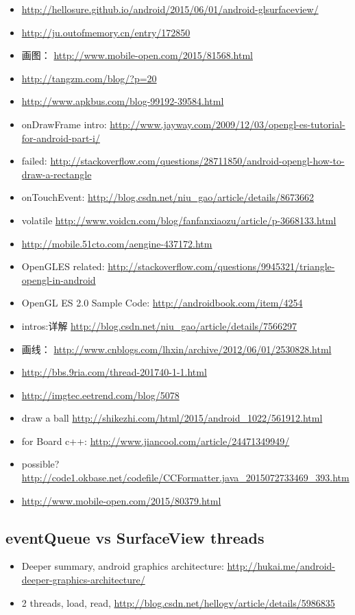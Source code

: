 \documentclass[9pt,b5paper]{article}
\begin{document}
\begin{itemize}
\item \url{http://hellosure.github.io/android/2015/06/01/android-glsurfaceview/}
\item \url{http://ju.outofmemory.cn/entry/172850}
\item 画图： \url{http://www.mobile-open.com/2015/81568.html}
\item \url{http://tangzm.com/blog/?p=20}
\item \url{http://www.apkbus.com/blog-99192-39584.html}
\item onDrawFrame intro: \url{http://www.jayway.com/2009/12/03/opengl-es-tutorial-for-android-part-i/}
\item failed: \url{http://stackoverflow.com/questions/28711850/android-opengl-how-to-draw-a-rectangle}
\item onTouchEvent: \url{http://blog.csdn.net/niu_gao/article/details/8673662}
\item volatile \url{http://www.voidcn.com/blog/fanfanxiaozu/article/p-3668133.html}
\item \url{http://mobile.51cto.com/aengine-437172.htm}
\item OpenGLES related: \url{http://stackoverflow.com/questions/9945321/triangle-opengl-in-android}
\item OpenGL ES 2.0 Sample Code: \url{http://androidbook.com/item/4254}
\item intros:详解 \url{http://blog.csdn.net/niu_gao/article/details/7566297}
\item 画线： \url{http://www.cnblogs.com/lhxin/archive/2012/06/01/2530828.html}
\item \url{http://bbs.9ria.com/thread-201740-1-1.html}
\item \url{http://imgtec.eetrend.com/blog/5078}
\item draw a ball \url{http://shikezhi.com/html/2015/android_1022/561912.html}
\item for Board c++: \url{http://www.jiancool.com/article/24471349949/}
\item possible? \url{http://code1.okbase.net/codefile/CCFormatter.java_2015072733469_393.htm}
\item \url{http://www.mobile-open.com/2015/80379.html}
\end{itemize}

\subsection{eventQueue vs SurfaceView threads}
\label{sec-2-3}
\begin{itemize}
\item Deeper summary, android graphics architecture: \url{http://hukai.me/android-deeper-graphics-architecture/}
\item 2 threads, load, read, \url{http://blog.csdn.net/hellogv/article/details/5986835}
\end{itemize}
\end{document}

